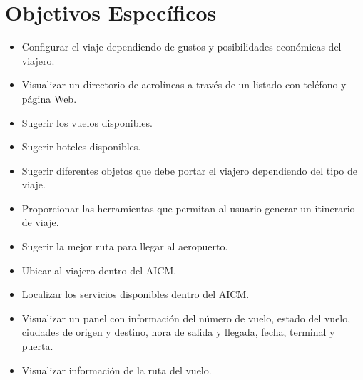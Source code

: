 \section{Objetivos Específicos}

\begin{itemize}
	\item	Configurar el viaje dependiendo de gustos y posibilidades económicas del viajero.
	\item	Visualizar un directorio de aerolíneas a través de un listado con teléfono y página Web.
	\item	Sugerir los vuelos disponibles.
	\item Sugerir hoteles disponibles. 
	\item	Sugerir diferentes objetos que debe portar el viajero dependiendo del tipo de viaje.
	\item	Proporcionar las herramientas que permitan al usuario generar un itinerario de viaje.
	\item	Sugerir la mejor ruta para llegar al aeropuerto.
	\item	Ubicar al viajero dentro del AICM.
	\item	Localizar los servicios disponibles dentro del AICM.
	\item	Visualizar un panel con información del número de vuelo, estado del vuelo,  ciudades de origen y destino, hora de salida y llegada, fecha, terminal y puerta.
	\item	Visualizar información de la ruta del vuelo.
\end{itemize}